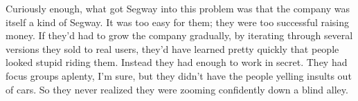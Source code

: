 Curiously enough, what got Segway into
                  this problem was that the company was itself a kind of Segway.
                  It was too easy for them; they were too successful raising
                  money. If they'd had to grow the company gradually, by
                  iterating through several versions they sold to real users,
                  they'd have learned pretty quickly that people looked stupid
                  riding them. Instead they had enough to work in secret. They
                  had focus groups aplenty, I'm sure, but they didn't have the
                  people yelling insults out of cars. So they never realized
                  they were zooming confidently down a blind alley.


              
            
          
            
              
                


                  
              
            
          
